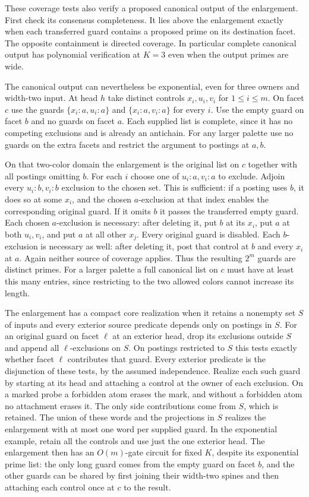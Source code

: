 These coverage tests also verify a proposed canonical output
of the enlargement. First check its consensus completeness.
It lies above the enlargement exactly when each transferred
guard contains a proposed prime on its destination facet.
The opposite containment is directed coverage. In particular
complete canonical output has polynomial verification at
$K=3$ even when the output primes are wide.

The canonical output can nevertheless be exponential, even
for three owners and width-two input. At head $h$ take
distinct controls $x_i,u_i,v_i$ for $1\le i\le m$. On facet
$c$ use the guards $\{x_i:a,u_i:a\}$ and
$\{x_i:a,v_i:a\}$ for every $i$. Use the empty guard on facet
$b$ and no guards on facet $a$. Each supplied list is complete,
since it has no competing exclusions and is already an
antichain. For any larger palette use no guards on the extra
facets and restrict the argument to postings at $a,b$.

On that two-color domain the enlargement is the original
list on $c$ together with all postings omitting $b$.
For each $i$ choose one of $u_i:a,v_i:a$ to exclude.
Adjoin every $u_i:b,v_i:b$ exclusion to the chosen set.
This is sufficient: if a posting uses $b$, it does so at
some $x_i$, and the chosen $a$-exclusion at that index
enables the corresponding original guard. If it omits
$b$ it passes the transferred empty guard.
Each chosen $a$-exclusion is necessary: after deleting
it, put $b$ at its $x_i$, put $a$ at both $u_i,v_i$,
and put $a$ at all other $x_j$. Every original guard
is disabled. Each $b$-exclusion is necessary as well:
after deleting it, post that control at $b$ and every
$x_i$ at $a$. Again neither source of coverage applies.
Thus the resulting $2^m$ guards are distinct primes.
For a larger palette a full canonical list on $c$ must
have at least this many entries, since restricting to
the two allowed colors cannot increase its length.

The enlargement has a compact core realization when it
retains a nonempty set $S$ of inputs and every exterior
source predicate depends only on postings in $S$.
For an original guard on facet $\ell$ at an exterior head,
drop its exclusions outside $S$ and append all $\ell$-exclusions
on $S$. On postings restricted to $S$ this tests exactly
whether facet $\ell$ contributes that guard. Every exterior
predicate is the disjunction of these tests, by the assumed
independence. Realize each such guard by starting at its head
and attaching a control at the owner of each exclusion.
On a marked probe a forbidden atom erases the mark, and
without a forbidden atom no attachment erases it. The only
side contributions come from $S$, which is retained. The
union of these words and the projections in $S$ realizes the
enlargement with at most one word per supplied guard.
In the exponential example, retain all the controls and
use just the one exterior head. The enlargement then has
an $O(m)$-gate circuit for fixed $K$, despite its exponential
prime list: the only long guard comes from the empty guard
on facet $b$, and the other guards can be shared by first
joining their width-two spines and then attaching each
control once at $c$ to the result.

